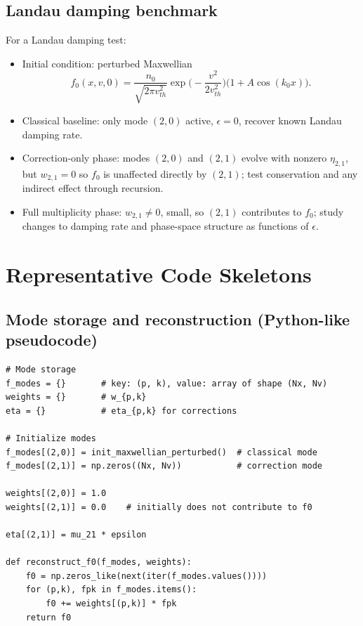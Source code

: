 \documentclass[11pt]{article}
\begin{document}
\subsection{Landau damping benchmark}

For a Landau damping test:
\begin{itemize}
  \item Initial condition: perturbed Maxwellian
    \[
      f_0(x,v,0) = \frac{n_0}{\sqrt{2\pi v_{th}^2}}
                   \exp\Big(-\frac{v^2}{2 v_{th}^2}\Big)
                   \big(1 + A\cos(k_0 x)\big).
    \]
  \item Classical baseline: only mode $(2,0)$ active, $\epsilon=0$,
        recover known Landau damping rate.
  \item Correction-only phase: modes $(2,0)$ and $(2,1)$ evolve with
        nonzero $\eta_{2,1}$, but $w_{2,1}=0$ so $f_0$ is unaffected
        directly by $(2,1)$; test conservation and any indirect effect
        through recursion.
  \item Full multiplicity phase: $w_{2,1}\neq 0$, small, so $(2,1)$
        contributes to $f_0$; study changes to damping rate and
        phase-space structure as functions of $\epsilon$.
\end{itemize}

\section{Representative Code Skeletons}

\subsection{Mode storage and reconstruction (Python-like pseudocode)}

\begin{verbatim}
# Mode storage
f_modes = {}       # key: (p, k), value: array of shape (Nx, Nv)
weights = {}       # w_{p,k}
eta = {}           # eta_{p,k} for corrections

# Initialize modes
f_modes[(2,0)] = init_maxwellian_perturbed()  # classical mode
f_modes[(2,1)] = np.zeros((Nx, Nv))           # correction mode

weights[(2,0)] = 1.0
weights[(2,1)] = 0.0    # initially does not contribute to f0

eta[(2,1)] = mu_21 * epsilon

def reconstruct_f0(f_modes, weights):
    f0 = np.zeros_like(next(iter(f_modes.values())))
    for (p,k), fpk in f_modes.items():
        f0 += weights[(p,k)] * fpk
    return f0
\end{verbatim}
\end{document}
